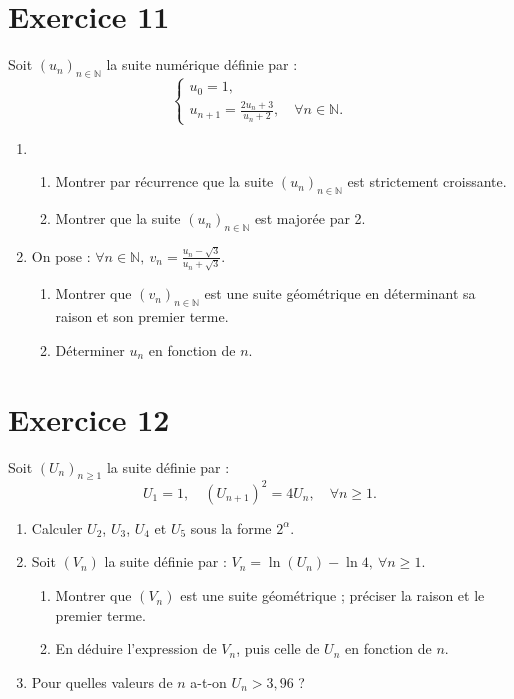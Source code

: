 \documentclass[12pt]{article}
\begin{document}
\section*{Exercice 11}

Soit \((u_n)_{n \in \mathbb{N}}\) la suite numérique définie par :
\[
\begin{cases}
u_0 = 1, \\
u_{n+1} = \frac{2u_n + 3}{u_n + 2}, \quad \forall n \in \mathbb{N}.
\end{cases}
\]

\begin{enumerate}
    \item 
    \begin{enumerate}
        \item Montrer par récurrence que la suite \((u_n)_{n \in \mathbb{N}}\) est strictement croissante.
        \item Montrer que la suite \((u_n)_{n \in \mathbb{N}}\) est majorée par 2.
    \end{enumerate}

    \item On pose : \(\forall n \in \mathbb{N}, \ v_n = \frac{u_n - \sqrt{3}}{u_n + \sqrt{3}}\).
    \begin{enumerate}
        \item Montrer que \((v_n)_{n \in \mathbb{N}}\) est une suite géométrique en déterminant sa raison et son premier terme.
        \item Déterminer \(u_n\) en fonction de \(n\).
    \end{enumerate}
\end{enumerate}

\section*{Exercice 12}

Soit \((U_n)_{n \geq 1}\) la suite définie par :
\[
U_1 = 1, \quad (U_{n+1})^2 = 4U_n, \quad \forall n \geq 1.
\]

\begin{enumerate}
    \item Calculer \(U_2\), \(U_3\), \(U_4\) et \(U_5\) sous la forme \(2^\alpha\).
    \item Soit \((V_n)\) la suite définie par : \(V_n = \ln(U_n) - \ln 4, \ \forall n \geq 1\).
    \begin{enumerate}
        \item Montrer que \((V_n)\) est une suite géométrique ; préciser la raison et le premier terme.
        \item En déduire l'expression de \(V_n\), puis celle de \(U_n\) en fonction de \(n\).
    \end{enumerate}
    \item Pour quelles valeurs de \(n\) a-t-on \(U_n > 3,96\) ?
\end{enumerate}
\end{document}
